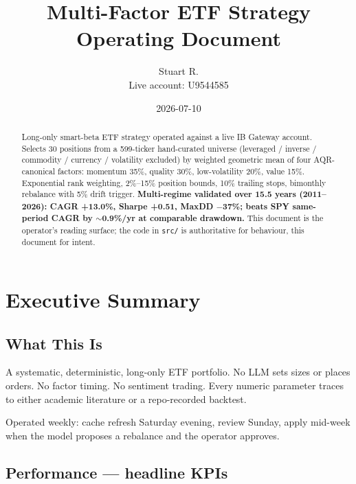 \documentclass[11pt,a4paper]{article}
\title{\textbf{Multi-Factor ETF Strategy}\\
\large Operating Document}
\author{Stuart R. \\ Live account: U9544585}
\date{2026-07-10}
\begin{document}
\maketitle

\begin{abstract}
Long-only smart-beta ETF strategy operated against a live IB Gateway account. Selects 30 positions from a 599-ticker hand-curated universe (leveraged / inverse / commodity / currency / volatility excluded) by weighted geometric mean of four AQR-canonical factors: momentum 35\%, quality 30\%, low-volatility 20\%, value 15\%. Exponential rank weighting, 2\%--15\% position bounds, 10\% trailing stops, bimonthly rebalance with 5\% drift trigger. \textbf{Multi-regime validated over 15.5 years (2011--2026): CAGR +13.0\%, Sharpe +0.51, MaxDD $-$37\%; beats SPY same-period CAGR by $\sim$0.9\%/yr at comparable drawdown.} This document is the operator's reading surface; the code in \texttt{src/} is authoritative for behaviour, this document for intent.
\end{abstract}

\newpage
\tableofcontents
\newpage

\section{Executive Summary}
\label{sec:exec}

\subsection{What This Is}

A systematic, deterministic, long-only ETF portfolio. No LLM sets sizes or places orders. No factor timing. No sentiment trading. Every numeric parameter traces to either academic literature or a repo-recorded backtest.

Operated weekly: cache refresh Saturday evening, review Sunday, apply mid-week when the model proposes a rebalance and the operator approves.

\subsection{Performance --- headline KPIs}
\end{document}
